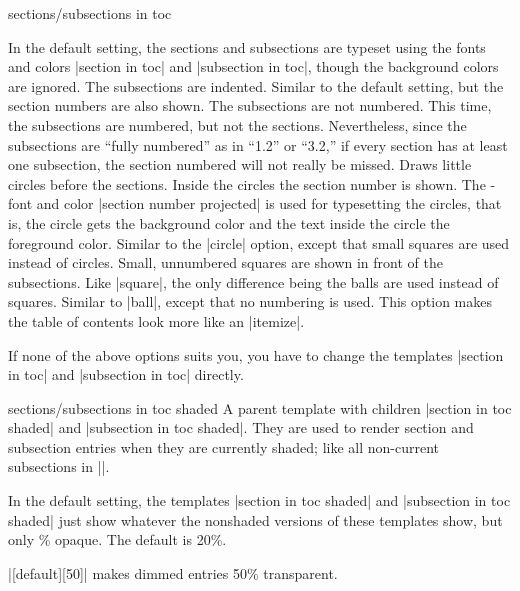 \begin{command}{\tableofcontents{}}
\begin{element}{sections/subsections in toc}
    \begin{templateoptions}
      In the default setting, the sections and subsections are typeset using the fonts and colors |section in toc| and |subsection in toc|, though the background colors are ignored. The subsections are indented.
      Similar to the default setting, but the section numbers are also shown. The subsections are not numbered.
      This time, the subsections are numbered, but not the sections. Nevertheless, since the subsections are ``fully numbered'' as in ``1.2'' or ``3.2,'' if every section has at least one subsection, the section numbered will not really be missed.
      Draws little circles before the sections. Inside the circles the section number is shown. The \beamer-font and color |section number projected| is used for typesetting the circles, that is, the circle gets the background color and the text inside the circle the foreground color.
      Similar to the |circle| option, except that small squares are used instead of circles. Small, unnumbered squares are shown in front of the subsections.
      Like |square|, the only difference being the balls are used instead of squares.
      Similar to |ball|, except that no numbering is used. This option makes the table of contents look more like an |itemize|.
    \end{templateoptions}

    If none of the above options suits you, you have to change the templates |section in toc| and |subsection in toc| directly.
  \end{element}

  \begin{element}{sections/subsections in toc shaded}\semiyes\no\no
    A parent template with children |section in toc shaded| and |subsection in toc shaded|. They are used to render section and subsection entries when they are currently shaded; like all non-current subsections in |\tableofcontents[currentsubsection]|.

    \begin{templateoptions}
      In the default setting, the templates |section in toc shaded| and |subsection in toc shaded| just show whatever the nonshaded versions of these templates show, but only \% opaque. The default is 20\%.

      \example
      |[default][50]| makes dimmed entries 50\% transparent.
    \end{templateoptions}
  \end{element}
\end{command}


